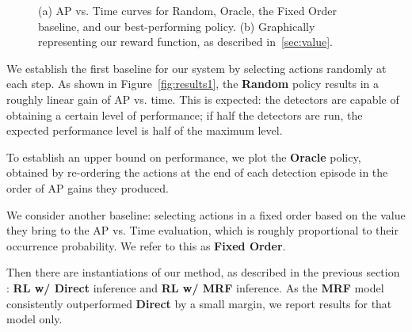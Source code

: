 \begin{figure}[h!]
\centering
{} \hfill
{}
\caption{
(a) AP vs. Time curves for Random, Oracle, the Fixed Order baseline, and our best-performing policy. (b) Graphically representing our reward function, as described in~\autoref{sec:value}.
}
\end{figure}

We establish the first baseline for our system by selecting actions randomly at each step.
As shown in Figure~\autoref{fig:results1}, the \textbf{Random} policy results in a roughly linear gain of AP vs. time.
This is expected: the detectors are capable of obtaining a certain level of performance; if half the detectors are run, the expected performance level is half of the maximum level.

To establish an upper bound on performance, we plot the \textbf{Oracle} policy, obtained by re-ordering the actions at the end of each detection episode in the order of AP gains they produced.

We consider another baseline: selecting actions in a fixed order based on the value they bring to the AP vs. Time evaluation, which is roughly proportional to their occurrence probability.
We refer to this as \textbf{Fixed Order}.

Then there are instantiations of our method, as described in the previous section : \textbf{RL w/ Direct} inference and \textbf{RL w/ MRF} inference.
As the \textbf{MRF} model consistently outperformed \textbf{Direct} by a small margin, we report results for that model only.

